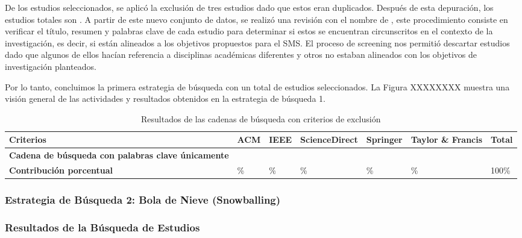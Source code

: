 
De los \itot{} estudios seleccionados, se aplicó la exclusión de tres estudios dado que estos eran duplicados. Después de esta depuración, los estudios totales son \depTot{}. A partir de este nuevo conjunto de datos, se realizó una revisión con el nombre de  , este procedimiento consiste en verificar el título, resumen y palabras clave de cada estudio para determinar si estos se encuentran circunscritos en el contexto de la investigación, es decir, si están alineados a los objetivos propuestos para el SMS. El proceso de screening nos permitió descartar \screenTot{} estudios dado que algunos de ellos hacían referencia a disciplinas académicas diferentes y otros no estaban alineados con los objetivos de investigación planteados.

Por lo tanto, concluimos la primera estrategia de búsqueda con un total de \screenTot{} estudios seleccionados. La Figura XXXXXXXX muestra una visión general de las actividades y resultados obtenidos en la estrategia de búsqueda 1.


\begin{table}[htbp]
    \centering
    \caption{Resultados de las cadenas de búsqueda con criterios de exclusión}
    \label{table:search_results_exclusion}
    \begin{tabular}{p{4.5cm}p{1.5cm}p{1.5cm}p{2cm}p{1.8cm}p{1.8cm}p{1.5cm}}
        \toprule
        \textbf{Criterios}                                        & \textbf{ACM} & \textbf{IEEE} & \textbf{ScienceDirect} & \textbf{Springer} & \textbf{Taylor \& Francis} & \textbf{Total} \\
        \midrule
        \textbf{Cadena de búsqueda con palabras clave únicamente} & \iacm{}      & \iieee{}      & \isd{}                 & \ispr{}           & \itf{}                     & \itot{}        \\
        \addlinespace[0.8em]
        \textbf{Contribución porcentual}                          & \iacmp{}\%   & \iieeep{}\%   & \isdp{}\%              & \isprp{}\%        & \itfp{}\%                  & 100\%          \\
        \bottomrule
    \end{tabular}
\end{table}


\subsubsection{Estrategia de Búsqueda 2: Bola de Nieve (Snowballing)}


\subsubsection{Resultados de la Búsqueda de Estudios}\label{subsubsec:resultados-busqueda}


